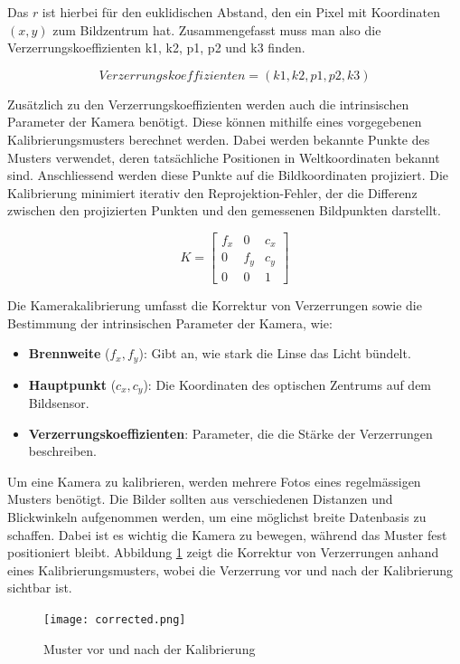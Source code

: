 Das \(r\) ist hierbei für den euklidischen Abstand, den ein Pixel mit Koordinaten \((x, y)\) zum Bildzentrum hat.
Zusammengefasst muss man also die Verzerrungskoeffizienten k1, k2, p1, p2 und k3 finden.

\[
Verzerrungskoeffizienten = (k1, k2, p1, p2, k3)
\]

Zusätzlich zu den Verzerrungskoeffizienten werden auch die intrinsischen Parameter der Kamera benötigt. Diese können 
mithilfe eines vorgegebenen Kalibrierungsmusters berechnet werden. Dabei werden bekannte Punkte des Musters verwendet,
deren tatsächliche Positionen in Weltkoordinaten bekannt sind. Anschliessend werden diese Punkte auf die Bildkoordinaten
projiziert. Die Kalibrierung minimiert iterativ den Reprojektion-Fehler, der die Differenz zwischen den projizierten 
Punkten und den gemessenen Bildpunkten darstellt.

\[
K =
\begin{bmatrix}
f_x & 0 & c_x \\
0 & f_y & c_y \\
0 & 0 & 1
\end{bmatrix}
\]

Die Kamerakalibrierung umfasst die Korrektur von Verzerrungen sowie die Bestimmung der 
intrinsischen Parameter der Kamera, wie:

\begin{itemize}
    \item \textbf{Brennweite} (\( f_x, f_y \)): Gibt an, wie stark die Linse das Licht bündelt.
    \item \textbf{Hauptpunkt} (\( c_x, c_y \)): Die Koordinaten des optischen Zentrums auf dem Bildsensor.
    \item \textbf{Verzerrungskoeffizienten}: Parameter, die die Stärke der Verzerrungen beschreiben.
\end{itemize}


Um eine Kamera zu kalibrieren, werden mehrere Fotos eines regelmässigen Musters 
benötigt. Die Bilder sollten aus verschiedenen Distanzen und Blickwinkeln aufgenommen werden,
um eine möglichst breite Datenbasis zu schaffen. Dabei ist es wichtig die Kamera zu bewegen, während
das Muster fest positioniert bleibt. Abbildung \ref{fig:corrected} zeigt die Korrektur von Verzerrungen
anhand eines Kalibrierungsmusters, wobei die Verzerrung vor und nach der Kalibrierung sichtbar ist.

\begin{figure}[H]
    \texttt{[image: corrected.png]}
    \caption{Muster vor und nach der Kalibrierung}
    \label{fig:corrected}
\end{figure}

